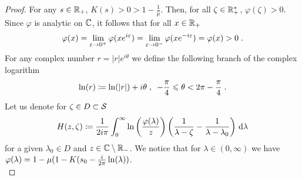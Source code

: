 \begin{proof}
For any $s \in \mathbb{R}_+$, $K(s) > 0 > 1 - \frac1\mu$. Then, 
for all $\zeta \in \mathbb{R}_+^*$, $\varphi(\zeta) > 0$.
Since $\varphi$ is analytic on $\mathbb{C}$, it follows that for all $x \in \mathbb{R}_+$ 
    $$\varphi(x) 
    = \lim_{\varepsilon \to 0^+} \varphi(xe^{i\varepsilon}) 
    = \lim_{\varepsilon \to 0^-}\varphi(xe^{-i\varepsilon}) 
    = \varphi(x) > 0 \; .$$
For any complex number $r = |r|e^{i\theta}$ we define the following branch of the complex logarithm
\begin{equation}\label{def:log}
\ln(r) \coloneqq \ln(|r|) + i\theta \; , \enspace -\frac{\pi}{4} \leqslant \theta < 2\pi - \frac{\pi}{4}  \; .
\end{equation}
Let us denote for $\zeta \in D \subset \mathcal{S}$
    \begin{align}\label{def:H}
        H(z,\zeta) \coloneqq \frac{1}{2i\pi }\int_0^\infty \ln\left(\frac{\varphi(\lambda)}{z}\right) \left( \frac{1}{\lambda-\zeta} - \frac{1}{\lambda-\lambda_0}\right) \,\mathrm{d} \lambda
    \end{align}
for a given $\lambda_0 \in D$ and $z \in \mathbb{C} \setminus \mathbb{R}_-$. We notice that for $\lambda \in (0,\infty)$ we have $\varphi(\lambda)=1-\mu(1-K(s_0-\frac{i}{2\pi} \ln(\lambda))$.\\


\end{proof}

